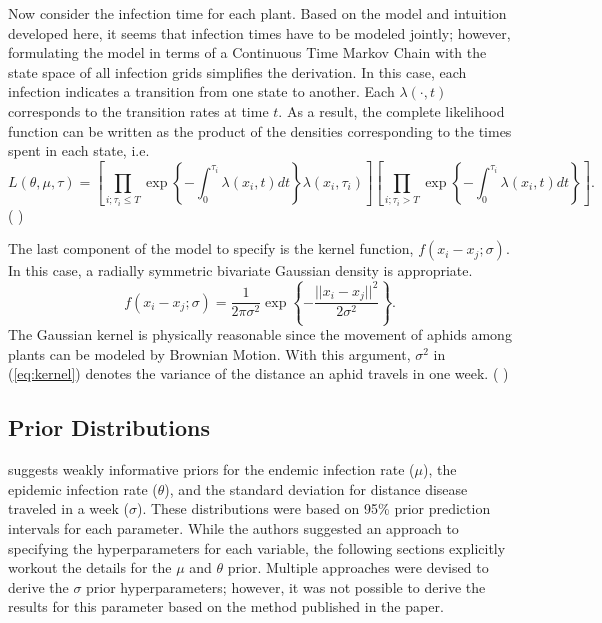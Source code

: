 \documentclass{uwstat572}
\newcommand{\vmcomment}[1]{({\color{blue}{VM's comment:}} \textbf{\color{blue}{#1}})}
\begin{document}
Now consider the infection time for each plant. 
Based on the model and intuition developed here, it seems that infection times have to be modeled jointly; however, formulating the model in terms of a Continuous Time Markov Chain with the state space of all infection grids simplifies the derivation. 
In this case, each infection indicates a transition from one state to another. 
Each $\lambda(\cdot, t)$ corresponds to the transition rates at time $t$.
As a result, the complete likelihood function can be written as the product of the densities corresponding to the times spent in each state, i.e.
\begin{equation} 
L(\theta, \mu, \tau) = \left[ \prod_{i;\tau_i \le T} \exp \left\{-\int^{\tau_i}_0 \lambda(x_i, t)dt\right \} \lambda(x_i, \tau_i)\right] \left[ \prod_{i;\tau_i > T} \exp \left\{-\int^{\tau_i}_0 \lambda(x_i, t)dt \right\}\right] .
\end{equation}
\vmcomment{That derivation would work if all infection times were independent, which is not true for inhomogeneous CTMCs. Therefore, you need to comment on what grounds you can just multiply hazards and survival functions.}

The last component of the model to specify is the kernel function, $f(x_i -x_j; \sigma)$. 
In this case, a radially symmetric bivariate Gaussian density is appropriate. 
\begin{equation} f( x_i-x_j;\sigma) = \frac{1}{2\pi \sigma^2} \exp \left\{-\frac{ ||x_i-x_j||^2}{2\sigma^2} \right\}.
\label{eq:kernel} \end{equation}
The Gaussian kernel is physically reasonable since the movement of aphids among plants can be modeled by Brownian Motion. 
With this argument, $\sigma^2$ in (\ref{eq:kernel}) denotes the variance of the distance an aphid travels in one week. 
\vmcomment{Just noticed, you keep using $x_i - x_j$ without defining it. 
Are $x$s two-dimensional? If yes, why aren't you using Euclidean distance?}

\subsection{Prior Distributions}
\citet{Brown} suggests weakly informative priors for the endemic infection rate ($\mu$), the epidemic infection rate ($\theta$), and the standard deviation for distance disease traveled in a week ($\sigma$). 
These distributions were based on 95\% prior prediction intervals for each parameter. 
While the authors suggested an approach to specifying the hyperparameters for each variable, the following sections explicitly workout the details for the $\mu$ and $\theta$ prior. 
Multiple approaches were devised to derive the $\sigma$ prior hyperparameters; however, it was not possible to derive the results for this parameter based on the method published in the paper. 
\end{document}
